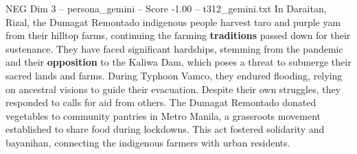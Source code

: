 \begin{textsample}{NEG Dim 3 – persona\_gemini – Score -1.00 – t312\_gemini.txt}  \label{ex:f3_neg_008}
In Daraitan, Rizal, the Dumagat Remontado indigenous people harvest taro and purple yam from their hilltop farms, continuing the farming \textbf{traditions} passed down for their sustenance.
They have faced significant hardships, stemming from the pandemic and their \textbf{opposition} to the Kaliwa Dam, which poses a threat to submerge their sacred lands and farms.
During Typhoon Vamco, they endured flooding, relying on ancestral visions to guide their evacuation.
Despite their own struggles, they responded to calls for aid from others.
The Dumagat Remontado donated vegetables to community pantries in Metro Manila, a grassroots movement established to share food during lockdowns.
This act fostered solidarity and bayanihan, connecting the indigenous farmers with urban residents.

\end{textsample}
